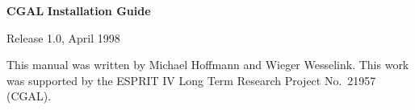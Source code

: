 
\pagestyle{empty}

\begin{titlepage}
\mbox{}
\vskip3cm
\centerline{ 
             }

\vskip2cm
\centerline{ {\Huge\bf CGAL} {\huge\bf Installation Guide} }

\vskip2cm
\centerline{Release 1.0, April 1998}

\end{titlepage}

\mbox{}
\vfill
This manual was written by Michael Hoffmann and Wieger Wesselink.
\vfill
This work was supported
by the ESPRIT IV Long Term Research Project No.~21957 (CGAL).
\vskip5cm

\pagestyle{plain}
\setcounter{page}{0}
\cleardoublepage

